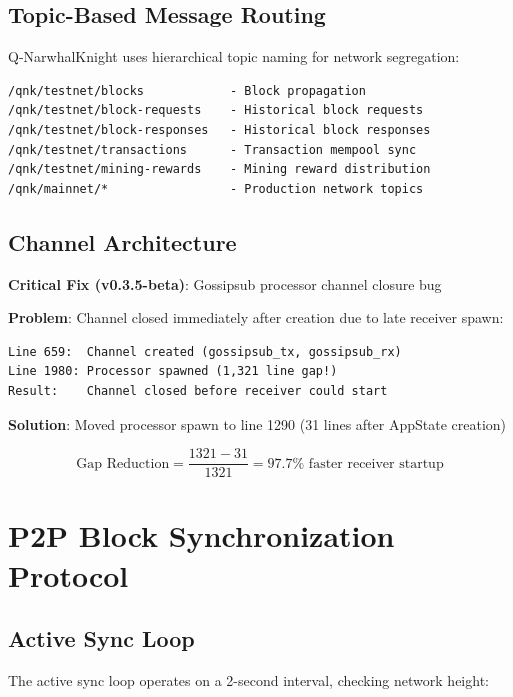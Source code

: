\documentclass[11pt,a4paper]{article}
\begin{document}
\subsection{Topic-Based Message Routing}

Q-NarwhalKnight uses hierarchical topic naming for network segregation:

\begin{verbatim}
/qnk/testnet/blocks            - Block propagation
/qnk/testnet/block-requests    - Historical block requests
/qnk/testnet/block-responses   - Historical block responses
/qnk/testnet/transactions      - Transaction mempool sync
/qnk/testnet/mining-rewards    - Mining reward distribution
/qnk/mainnet/*                 - Production network topics
\end{verbatim}

\subsection{Channel Architecture}

\textbf{Critical Fix (v0.3.5-beta)}: Gossipsub processor channel closure bug

\textbf{Problem}: Channel closed immediately after creation due to late receiver spawn:

\begin{verbatim}
Line 659:  Channel created (gossipsub_tx, gossipsub_rx)
Line 1980: Processor spawned (1,321 line gap!)
Result:    Channel closed before receiver could start
\end{verbatim}

\textbf{Solution}: Moved processor spawn to line 1290 (31 lines after AppState creation)

\begin{equation}
\text{Gap Reduction} = \frac{1321 - 31}{1321} = 97.7\% \text{ faster receiver startup}
\end{equation}

\section{P2P Block Synchronization Protocol}

\subsection{Active Sync Loop}

The active sync loop operates on a 2-second interval, checking network height:
\end{document}
